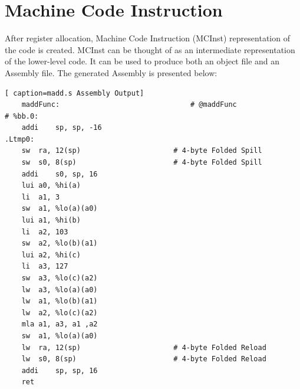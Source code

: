 \section{Machine Code Instruction}
After register allocation, Machine Code Instruction (MCInst) representation of the code is created. MCInst can be thought of as an intermediate representation of the lower-level code. It can be used to produce both an object file and an Assembly file. The generated Assembly is presented below:
\begin{lstlisting}[ caption=madd.s Assembly Output]
    maddFunc:                               # @maddFunc
# %bb.0:
	addi	sp, sp, -16
.Ltmp0:
	sw	ra, 12(sp)                      # 4-byte Folded Spill
	sw	s0, 8(sp)                       # 4-byte Folded Spill
	addi	s0, sp, 16
	lui	a0, %hi(a)
	li	a1, 3
	sw	a1, %lo(a)(a0)
	lui	a1, %hi(b)
	li	a2, 103
	sw	a2, %lo(b)(a1)
	lui	a2, %hi(c)
	li	a3, 127
	sw	a3, %lo(c)(a2)
	lw	a3, %lo(a)(a0)
	lw	a1, %lo(b)(a1)
	lw	a2, %lo(c)(a2)
	mla	a1, a3, a1 ,a2
	sw	a1, %lo(a)(a0)
	lw	ra, 12(sp)                      # 4-byte Folded Reload
	lw	s0, 8(sp)                       # 4-byte Folded Reload
	addi	sp, sp, 16
	ret
\end{lstlisting}